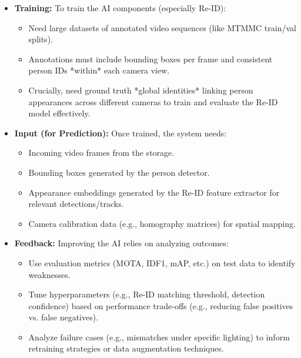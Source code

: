 \begin{itemize}
    \item \textbf{Training:} To train the AI components (especially Re-ID):
        \begin{itemize}
            \item Need large datasets of annotated video sequences (like MTMMC train/val splits).
            \item Annotations must include bounding boxes per frame and consistent person IDs *within* each camera view.
            \item Crucially, need ground truth *global identities* linking person appearances across different cameras to train and evaluate the Re-ID model effectively.
        \end{itemize}

    \item \textbf{Input (for Prediction):} Once trained, the system needs:
        \begin{itemize}
            \item Incoming video frames from the storage.
            \item Bounding boxes generated by the person detector.
            \item Appearance embeddings generated by the Re-ID feature extractor for relevant detections/tracks.
            \item Camera calibration data (e.g., homography matrices) for spatial mapping.
        \end{itemize}

    \item \textbf{Feedback:} Improving the AI relies on analyzing outcomes:
        \begin{itemize}
            \item Use evaluation metrics (MOTA, IDF1, mAP, etc.) on test data to identify weaknesses.
            \item Tune hyperparameters (e.g., Re-ID matching threshold, detection confidence) based on performance trade-offs (e.g., reducing false positives vs. false negatives).
            \item Analyze failure cases (e.g., mismatches under specific lighting) to inform retraining strategies or data augmentation techniques.
        \end{itemize}


\end{itemize}
